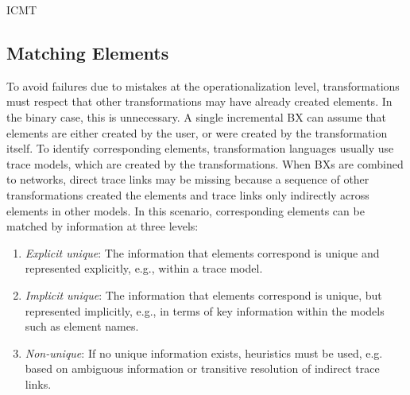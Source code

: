 \begin{copiedFrom}{ICMT}

\subsection{Matching Elements}
\label{chap:prevention:interoperability:matching}


To avoid failures due to mistakes at the operationalization level, transformations must respect that other transformations may have already created elements.
In the binary case, this is unnecessary.
A single incremental \ac{BX} can assume that elements are either created by the user, %
or were created by the transformation itself.
To identify corresponding elements, transformation languages usually use trace models, which are created by the transformations.
When \acp{BX} are combined to networks, %
direct trace links may be missing because a sequence of other transformations created the elements and trace links only indirectly across elements in other models.
In this scenario, corresponding elements can be matched by information at three levels:
\begin{enumerate}
    \item \emph{Explicit unique}: The information that elements correspond is unique and represented explicitly, e.g., within a trace model. %
    \item \emph{Implicit unique}: The information that elements correspond is unique, but represented implicitly, e.g., in terms of key information within the models such as element names. %
    \item \emph{Non-unique}: If no unique information exists, heuristics must be used, e.g. based on ambiguous information or transitive resolution of indirect trace links.
\end{enumerate}


\end{copiedFrom}
